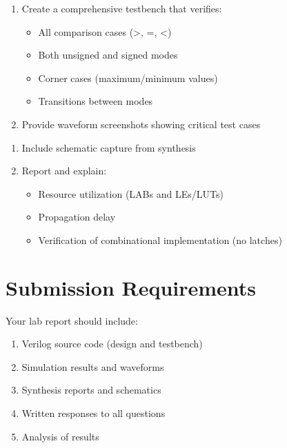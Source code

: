 \documentclass[12pt]{labmanual}
\begin{document}
\begin{question}[Verification]
\begin{enumerate}
    \item Create a comprehensive testbench that verifies:
    \begin{itemize}
        \item All comparison cases (>, =, <)
        \item Both unsigned and signed modes
        \item Corner cases (maximum/minimum values)
        \item Transitions between modes
    \end{itemize}
    \item Provide waveform screenshots showing critical test cases
\end{enumerate}
\end{question}

\begin{question}
\begin{enumerate}
    \item Include schematic capture from synthesis
    \item Report and explain:
    \begin{itemize}
        \item Resource utilization (LABs and LEs/LUTs)
        \item Propagation delay
        \item Verification of combinational implementation (no latches)
    \end{itemize}
\end{enumerate}
\end{question}

\section{Submission Requirements}
Your lab report should include:
\begin{enumerate}
    \item Verilog source code (design and testbench)
    \item Simulation results and waveforms
    \item Synthesis reports and schematics
    \item Written responses to all questions
    \item Analysis of results
\end{enumerate}
\end{document}
